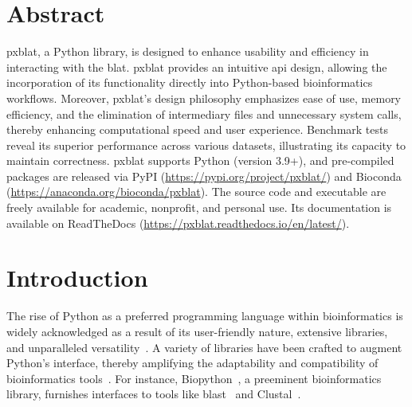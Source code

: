 \documentclass[10pt,letterpaper]{article}
\begin{document}
\section*{Abstract}
\gls{pxblat}, a Python library, is designed to enhance usability and efficiency in interacting with the \gls{blat}.
\gls{pxblat} provides an intuitive \gls{api} design, allowing the incorporation of its functionality directly into Python-based bioinformatics workflows.
Moreover, \gls{pxblat}'s design philosophy emphasizes ease of use, memory efficiency, and the elimination of intermediary files and unnecessary system calls, thereby enhancing computational speed and user experience.
Benchmark tests reveal its superior performance across various datasets, illustrating its capacity to maintain correctness.
\gls{pxblat} supports Python (version 3.9+), and pre-compiled packages are released via PyPI (\url{https://pypi.org/project/pxblat/}) and Bioconda (\url{https://anaconda.org/bioconda/pxblat}).
The source code and executable are freely available for academic, nonprofit, and personal use.
Its documentation is available on ReadTheDocs (\url{https://pxblat.readthedocs.io/en/latest/}).


\linenumbers

\section*{Introduction}
The rise of Python as a preferred programming language within bioinformatics is widely acknowledged as a result of its user-friendly nature, extensive libraries, and unparalleled versatility~\cite{perkel2015programming}.
A variety of libraries have been crafted to augment Python's interface, thereby amplifying the adaptability and compatibility of bioinformatics tools~\cite{putri2022analysing, cock2009biopython}.
For instance, Biopython~\cite{cock2009biopython}, a preeminent bioinformatics library, furnishes interfaces to tools like \gls{blast}~\cite{altschul1990basic} and Clustal~\cite{higgins1988clustal}.
\end{document}
